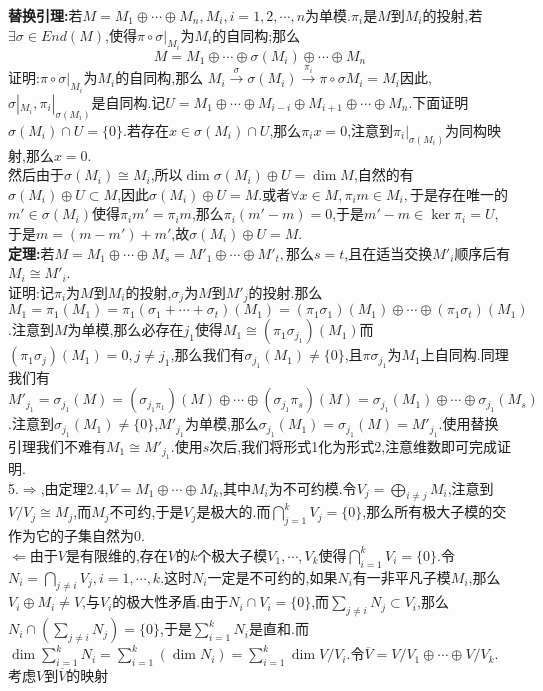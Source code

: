 \documentclass[b5paper]{ctexart}
\begin{document}
\pagestyle{plain}
\noindent
{}
\textbf{替换引理:}若$M=M_1\oplus \cdots \oplus M_n,M_i,i=1,2,\cdots,n$为单模.$\pi_i$是$M$到$M_i$的投射,若$\exists \sigma \in End(M)$,使得$\pi\circ \sigma|_{M_i}$为$M_i$的自同构;那么
\[M=M_1\oplus \cdots \oplus \sigma(M_i)\oplus \cdots \oplus M_n \]
证明:$\pi\circ \sigma|_{M_i}$为$M_i$的自同构,那么
$M_i\xrightarrow{\sigma}\sigma(M_i)\xrightarrow{\pi_i}\pi\circ \sigma{M_i}=M_i$因此,$\sigma|_{M_i},\pi_i|_{\sigma(M_i)}$是自同构.记$U=M_1\oplus \cdots \oplus M_{i-i}\oplus M_{i+1}\oplus \cdots \oplus M_n$.下面证明$\sigma(M_i)\cap U=\{0\}$.若存在$x\in \sigma(M_i)\cap U$,那么$\pi_i x=0$,注意到$\pi_i|_{\sigma(M_i)}$为同构映射,那么$x=0$.\\
然后由于$\sigma(M_i)\cong M_i$,所以$\dim \sigma(M_i)\oplus U=\dim M$,自然的有$\sigma(M_i)\oplus U\subset M$,因此$\sigma(M_i)\oplus U= M$.或者$\forall x\in M,\pi_i m\in M_i,$于是存在唯一的$m'\in \sigma(M_i)$使得$\pi_im'=\pi_im$,那么$\pi_i(m'-m)=0$,于是$m'-m\in \ker \pi_i=U$,于是$m=(m-m')+m'$,故$\sigma(M_i)\oplus U=M.$\\
\textbf{定理:}若$M=M_1\oplus \cdots \oplus M_s=M'_1\oplus \cdots \oplus M'_t,$那么$s=t$,且在适当交换$M'_i$顺序后有$M_i\cong M'_i$.\\
证明:记$\pi_i$为$M$到$M_i$的投射,$\sigma_j$为$M$到$M'_j$的投射.那么$M_1=\pi_1(M_1)=\pi_1(\sigma_1+\cdots+\sigma_t)(M_1)=(\pi_1\sigma_1)(M_1)\oplus \cdots \oplus (\pi_1\sigma_t)(M_1)$.注意到$M$为单模,那么必存在$j_1$使得$M_1\cong (\pi_1\sigma_{j_1})(M_1)$而$(\pi_1\sigma_{j})(M_1)=0,j\neq j_1$,那么我们有$\sigma_{j_1}(M_1)\neq \{0\}$,且$\pi\sigma_{j_1}$为$M_1$上自同构.同理我们有$M'_{j_1}=\sigma_{j_1}(M)=(\sigma_{j_1\pi_1})(M)\oplus\cdots\oplus (\sigma_{j_1}\pi_s)(M)=\sigma_{j_1}(M_1)\oplus\cdots\oplus \sigma_{j_1}(M_s)$.注意到$\sigma_{j_1}(M_1)\neq \{0\}$,$M'_{j_1}$为单模,那么$\sigma_{j_1}(M_1)=\sigma_{j_1}(M)=M'_{j_1}$.使用替换引理我们不难有$M_1\cong M'_{j_1}$.使用$s$次后,我们将形式1化为形式2,注意维数即可完成证明.\\
5.$\Rightarrow$,由定理2.4,$V=M_1\oplus\cdots \oplus M_k$,其中$M_i$为不可约模.令$V_j=\bigoplus_{i\neq j}M_i$,注意到$V/V_j\cong M_j$,而$M_j$不可约,于是$V_j$是极大的.而$\bigcap_{j=1}^kV_j=\{0\}$,那么所有极大子模的交作为它的子集自然为0.\\
$\Leftarrow$由于$V$是有限维的,存在$V$的$k$个极大子模$V_1,\cdots,V_k$使得$\bigcap_{i=1}^kV_i=\{0\}$.令$N_i=\bigcap_{j\neq i}V_j,i=1,\cdots,k.$这时$N_i$一定是不可约的,如果$N_i$有一非平凡子模$M_i$,那么$V_i\oplus M_i\neq V$,与$V_i$的极大性矛盾.由于$N_i\cap V_i=\{0\}$,而$ \sum_{j\neq i}N_j\subset V_i$,那么$N_i\cap\left( \sum_{j\neq i}N_j\right)=\{0\}$,于是$ \sum_{i=1}^kN_i$是直和.而$\dim \sum_{i=1}^kN_i=\sum_{i=1}^k\left( \dim N_i\right)=\sum_{i=1}^k\dim V/V_i.$令$\overline{V}=V/V_1\oplus\cdots \oplus V/V_k$.考虑$V$到$\overline{V}$的映射
\end{document}
